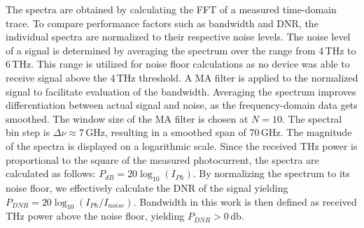 The spectra are obtained by calculating the FFT of a measured time-domain trace. To compare performance factors such as bandwidth and DNR, the individual spectra are normalized to their respective noise levels. The noise level of a signal is determined by averaging the spectrum over the range from \num{4}\,\si{\tera \hertz} to \num{6}\,\si{\tera \hertz}. This range is utilized for noise floor calculations as no device was able to receive signal above the \num{4}\,\si{\tera \hertz} threshold.  A MA filter is applied to the normalized signal to facilitate evaluation of the bandwidth. Averaging the spectrum improves differentiation between actual signal and noise, as the frequency-domain data gets smoothed. The window size of the MA filter is chosen at $N=10$. The spectral bin step is $\Delta \nu \approx 7$\,\si{\giga \hertz}, resulting in a smoothed span of \num{70}\,\si{\giga \hertz}. The magnitude of the spectra is displayed on a logarithmic scale. Since the received THz power is proportional to the square of the measured photocurrent, the spectra are calculated as follows: $P_{dB} = 20\log_{10}(I_{Ph})$. By normalizing the spectrum to its noise floor, we effectively calculate the DNR of the signal yielding $P_{DNR} = 20\log_{10}(I_{Ph}/I_{noise})$. Bandwidth in this work is then defined as received THz power above the noise floor, yielding $P_{DNR} > 0$\,\si{\decibel}.   

